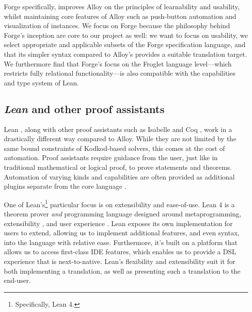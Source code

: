 Forge specifically, improves Alloy on the principles of learnability and usability, whilst maintaining core features of Alloy such as push-button automation and visualization of instances. We focus on Forge because the philosophy behind Forge's inception are core to our project as well: we want to focus on usability, we select appropriate and applicable subsets of the Forge specification language, and that its simpler syntax compared to Alloy's provides a suitable translation target. We furthermore find that Forge's focus on the Froglet language level---which restricts fully relational functionality---is also compatible with the capabilities and type system of Lean. 


\subsection{\emph{Lean} and other proof assistants}\label{sec:bg-lean}
Lean \cite{moura2021lean}, along with other proof assistants such as Isabelle \cite{paulson1994isabelle} and Coq \cite{bertot2013interactive}, work in a drastically different way compared to Alloy. While they are not limited by the same bound constraints of Kodkod-based solvers, this comes at the cost of automation. Proof assistants require guidance from the user, just like in traditional mathematical or logical proof, to prove statements and theorems. Automation of varying kinds and capabilities are often provided as additional plugins separate from the core language \cite{blanchette2010nitpick,ekici2017smtcoq,czajka2018hammer,limperg2023aesop}. 

One of Lean's\footnote{Specifically, Lean 4.} particular focus is on extensibility and ease-of-use. Lean 4 is a theorem prover \emph{and} programming language designed around metaprogramming, extensibility \cite{moura2021lean}, and user experience \cite{nawrocki2023extensible}. Lean exposes its own implementation for users to extend, allowing us to implement additional features, and even syntax, into the language with relative ease. Furthermore, it's built on a platform that allows us to access first-class IDE features, which enables us to provide a DSL experience that is next-to-native. Lean's flexibility and extensibility suit it for both implementing a translation, as well as presenting such a translation to the end-user. 

